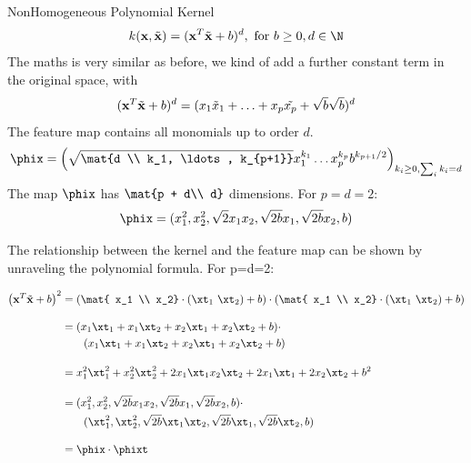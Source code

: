 \documentclass[11pt,compress,t,notes=noshow, xcolor=table]{beamer}
\begin{document}
\begin{vbframe}{NonHomogeneous Polynomial Kernel}
 $$k(\xv, \xtil) = (\xv^T \xtil + b)^d, \text{ for } b\geq 0, d \in \N$$
The maths is very similar as before, we kind of add a further constant term in the original space, with
$$ (\mathbf{x}^T \tilde{\mathbf{x}} + b)^d = (x_1 \tilde{x}_1 + \ldots + x_p \tilde{x_p} + \sqrt{b} \sqrt{b})^d$$
The feature map contains all monomials up to order $d$.
  $$\phix = \left( \sqrt{\mat{d \\ k_1, \ldots, k_{p+1}}} x_1^{k_1} \ldots x_p^{k_p} b^{k_{p+1}/2} \right)_{k_i \geq 0, \sum_i k_i = d}$$
The map $\phix$ has $\mat{p + d\\ d}$ dimensions. For $p=d=2$: 
$$\phix = (x_1^2, x_2^2, \sqrt{2} x_1 x_2, \sqrt{2b} x_1, \sqrt{2b} x_2, b)$$

\framebreak
  The relationship between the kernel and the feature map can be shown by unraveling the polynomial formula. For p=d=2:
  
  \begin{equation*}
    \begin{aligned}
        \left ( \xv^T \xtil + b  \right)^2 &=       \left ( \mat{ x_1 \\ x_2} \cdot (\xt_1 \ \xt_2) + b  \right) \cdot      \left ( \mat{ x_1 \\ x_2} \cdot (\xt_1 \ \xt_2) + b  \right) \\[10pt]
        &= (x_1 \xt_1 + x_1 \xt_2 + x_2 \xt_1 + x_2 \xt_2 + b) \cdot \\
         & \ \ \ \ \ \ (x_1 \xt_1 + x_1 \xt_2 + x_2 \xt_1 + x_2 \xt_2 + b) \\[10pt]
        &= x_1^2 \xt_1^2 + x_2^2 \xt_2^2  +  2 x_1 \xt_1 x_2 \xt_2  + 2 x_1 \xt_1 + 2 x_2 \xt_2  + b^2 \\[10pt]
        &= ( x_1^2 , x_2^2 , \sqrt{2b} x_1 x_2 , \sqrt{2b} x_1 , \sqrt{2b} x_2 , b ) \cdot \\
        & \ \ \ \ \ \  ( \xt_1^2 , \xt_2^2 ,\sqrt{2b} \xt_1 \xt_2 , \sqrt{2b} \xt_1 , \sqrt{2b} \xt_2 ,  b ) \\[10pt]
        &= \phix \cdot \phixt
    \end{aligned}
  \end{equation*}
\end{vbframe}
\end{document}
